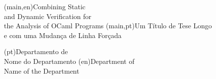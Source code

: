
%


\nttitle(main,en){Combining Static \\and Dynamic Verification for \\the Analysis of OCaml Programs}%
\nttitle(main,pt){Um Título de Tese Longo\\e com uma Mudança de Linha Forçada}%



\ntdepartment*(pt){Departamento de\\Nome do Departamento}
\ntdepartment*(en){Department of\\Name of the Department}


